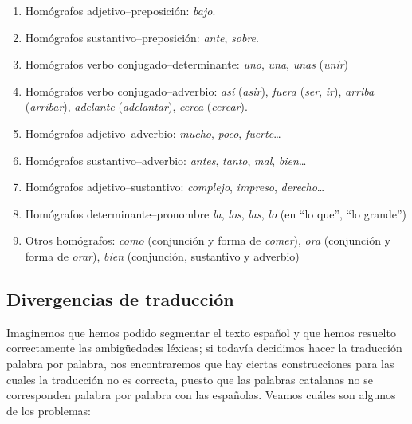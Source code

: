 \begin{enumerate}
\item Homógrafos adjetivo--preposición: \emph{bajo}. 

\item Homógrafos sustantivo--preposición: \emph{ante}, \emph{sobre}. 

\item Homógrafos verbo conjugado--determinante: \emph{uno}, \emph{una}, \emph{unas} (\emph{unir}) 

\item Homógrafos verbo conjugado--adverbio: \emph{así} (\emph{asir}), \emph{fuera} (\emph{ser}, \emph{ir}), \emph{ arriba} (\emph{arribar}), {\em adelante} (\emph{adelantar}), \emph{cerca} (\emph{cercar}). 

\item Homógrafos adjetivo--adverbio: \emph{mucho}, \emph{poco}, {\em fuerte}\ldots 

\item Homógrafos sustantivo--adverbio: \emph{antes}, \emph{tanto}, \emph{mal}, \emph{bien}\ldots 

\item Homógrafos adjetivo--sustantivo: \emph{complejo}, {\em impreso}, \emph{derecho}\ldots 

\item Homógrafos determinante--pronombre \emph{la}, \emph{los}, \emph{las}, \emph{lo} (en ``lo que'', ``lo grande'') 

\item Otros homógrafos: \emph{como} (conjunción y forma de \emph{comer}), \emph{ora} (conjunción y forma de \emph{orar}), \emph{bien} (conjunción, sustantivo y adverbio) 

\end{enumerate} 

\subsection{Divergencias de traducción} 

Imaginemos que hemos podido segmentar el texto español y que hemos resuelto correctamente las ambigüedades léxicas; si todavía decidimos hacer la traducción palabra por palabra, nos encontraremos que hay ciertas construcciones para las cuales la traducción no es correcta, puesto que las palabras catalanas no se corresponden palabra por palabra con las españolas. Veamos cuáles son algunos de los problemas: 

